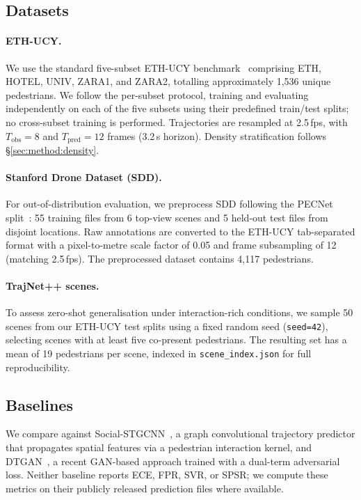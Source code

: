 \documentclass{article}
\begin{document}
\subsection{Datasets}
\label{sec:exp:datasets}

\paragraph{ETH-UCY.}
We use the standard five-subset ETH-UCY
benchmark~\cite{pellegrini2009eth,lerner2007ucy} comprising ETH, HOTEL, UNIV,
ZARA1, and ZARA2, totalling approximately 1,536 unique pedestrians. We follow
the per-subset protocol, training and evaluating independently on each of the
five subsets using their predefined train/test splits; no cross-subset training
is performed. Trajectories are resampled at 2.5\,fps, with
\(T_{\text{obs}} = 8\) and \(T_{\text{pred}} = 12\) frames (3.2\,s horizon).
Density stratification follows \S\ref{sec:method:density}.

\paragraph{Stanford Drone Dataset (SDD).}
For out-of-distribution evaluation, we preprocess SDD following the PECNet
split~\cite{mangalam2020pecnet}: 55 training files from 6 top-view scenes and
5 held-out test files from disjoint locations. Raw annotations are converted to
the ETH-UCY tab-separated format with a pixel-to-metre scale factor of 0.05
and frame subsampling of 12 (matching 2.5\,fps). The preprocessed dataset
contains 4,117 pedestrians.

\paragraph{TrajNet++ scenes.}
To assess zero-shot generalisation under interaction-rich conditions, we sample
50 scenes from our ETH-UCY test splits using a fixed random seed (\texttt{seed=42}),
selecting scenes with at least five co-present pedestrians. The resulting set
has a mean of 19 pedestrians per scene, indexed in
\texttt{scene\_index.json} for full reproducibility.

\subsection{Baselines}
\label{sec:exp:baselines}

We compare against Social-STGCNN~\cite{mohamed2020social}, a graph convolutional
trajectory predictor that propagates spatial features via a pedestrian
interaction kernel, and DTGAN~\cite{xie2024dtgan}, a recent GAN-based approach
trained with a dual-term adversarial loss. Neither baseline reports ECE, FPR,
SVR, or SPSR; we compute these metrics on their publicly released prediction
files where available.
\end{document}
